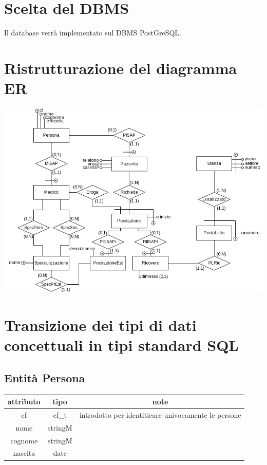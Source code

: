 \documentclass[a4paper,12pt]{report}
\begin{document}
    \chapter{Scelta del DBMS}
      Il database verrà implementato sul DBMS PostGreSQL.

    \chapter{Ristrutturazione del diagramma ER}
      \includegraphics[width=1\textwidth]{er_ristr.png}
    \chapter{Transizione dei tipi di dati concettuali in tipi standard SQL}
      \section*{Entità Persona}
        \begin{tabular}{|c|c|c|}
	        \hline attributo & tipo & note \\
	        \hline cf & cf\_t & introdotto per identiticare univocamente le persone \\
	        \hline nome & stringM & \\
	        \hline cognome & stringM & \\
	        \hline nascita & date & \\
	        \hline
        \end{tabular} \\
\end{document}
